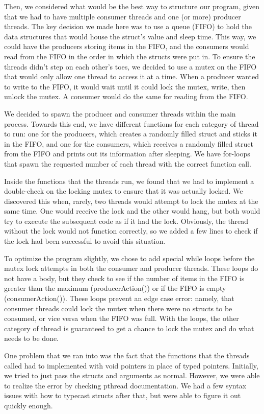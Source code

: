 \documentclass[letterpaper,10pt]{article}
\begin{document}
Then, we considered what would be the best way to structure our program, given that we had to have multiple consumer threads and one (or more) producer threads.
The key decision we made here was to use a queue (FIFO) to hold the data structures that would house the struct's value and sleep time.
This way, we could have the producers storing items in the FIFO, and the consumers would read from the FIFO in the order in which the structs were put in.
To ensure the threads didn't step on each other’s toes, we decided to use a mutex on the FIFO that would only allow one thread to access it at a time.
When a producer wanted to write to the FIFO, it would wait until it could lock the mutex, write, then unlock the mutex.
A consumer would do the same for reading from the FIFO.

We decided to spawn the producer and consumer threads within the main process.
Towards this end, we have different functions for each category of thread to run: one for the producers, which creates a randomly filled struct and sticks it in the FIFO, and one for the consumers, which receives a randomly filled struct from the FIFO and prints out its information after sleeping.
We have for-loops that spawn the requested number of each thread with the correct function call.

Inside the functions that the threads run, we found that we had to implement a double-check on the locking mutex to ensure that it was actually locked.
We discovered this when, rarely, two threads would attempt to lock the mutex at the same time.
One would receive the lock and the other would hang, but both would try to execute the subsequent code as if it had the lock.
Obviously, the thread without the lock would not function correctly, so we added a few lines to check if the lock had been successful to avoid this situation.

To optimize the program slightly, we chose to add special while loops before the mutex lock attempts in both the consumer and producer threads.
These loops do not have a body, but they check to see if the number of items in the FIFO is greater than the maximum (producerAction()) or if the FIFO is empty (consumerAction()).
These loops prevent an edge case error: namely, that consumer threads could lock the mutex when there were no structs to be consumed, or vice versa when the FIFO was full.
With the loops, the other category of thread is guaranteed to get a chance to lock the mutex and do what needs to be done.

One problem that we ran into was the fact that the functions that the threads called had to implemented with void pointers in place of typed pointers.
Initially, we tried to just pass the structs and arguments as normal.
However, we were able to realize the error by checking pthread documentation.
We had a few syntax issues with how to typecast structs after that, but were able to figure it out quickly enough.
\end{document}

